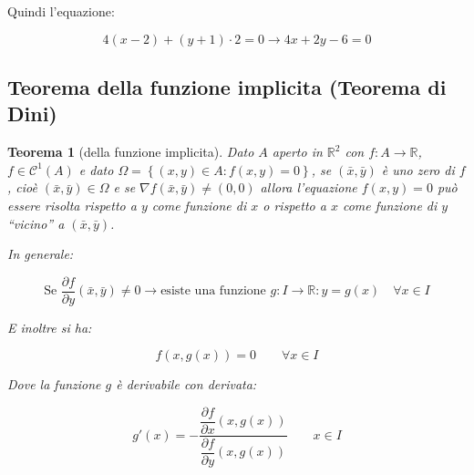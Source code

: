 \documentclass[a4paper]{article}
\newtheorem{theorem}{Teorema}
\newcommand{\dquotes}[1]{``#1''}
\begin{document}
	\noindent
	Quindi l'equazione:
	
	\begin{equation*}
		4\left(x-2\right) + \left(y+1\right) \cdot 2 = 0 \longrightarrow 4x +2y - 6 = 0
	\end{equation*}

	\newpage
	
	\subsection{Teorema della funzione implicita (Teorema di Dini)}
	
	\begin{theorem}[della funzione implicita]
		Dato $A$ aperto in $\mathbb{R}^{2}$ con $f: A \rightarrow \mathbb{R}$, $f \in \mathcal{C}^{1}\left(A\right)$ e dato $\Omega = \left\{\left(x,y\right) \in A : f\left(x,y\right) = 0\right\}$, se $\left(\bar{x}, \bar{y}\right)$ è uno zero di $f$, cioè $\left(\bar{x},\bar{y}\right) \in \Omega$ e se $\nabla f\left(\bar{x},\bar{y}\right) \ne \left(0,0\right)$ allora l'equazione $f\left(x,y\right) = 0$ può essere risolta rispetto a $y$ come funzione di $x$ o rispetto a $x$ come funzione di $y$ \dquotes{vicino} a $\left(\bar{x},\bar{y}\right)$.\newline
		
		\noindent
		In generale:
		
		\begin{equation*}
			\text{Se } \dfrac{\partial f}{\partial y}\left(\bar{x},\bar{y}\right) \ne 0 \longrightarrow \text{esiste una funzione } g: I \rightarrow \mathbb{R} : y = g\left(x\right) \hspace{1em} \forall x \in I
		\end{equation*}
	
		\noindent
		E inoltre si ha:
		
		\begin{equation*}
			f\left(x,g\left(x\right)\right) = 0 \hspace{2em} \forall x \in I
		\end{equation*}
	
		\noindent
		Dove la funzione $g$ è derivabile con derivata:
		
		\begin{equation*}
			g'\left(x\right) = - \dfrac{\dfrac{\partial f}{\partial x}\left(x,g\left(x\right)\right)}{\dfrac{\partial f}{\partial y}\left(x,g\left(x\right)\right)} \hspace{2em} x \in I
		\end{equation*}
	\end{theorem}
	
\end{document}
